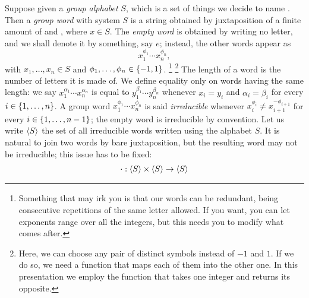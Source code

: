 \begin{example}\label{example:FreeGroup}
Suppose given a {\em group alphabet} \(S\), which is a set of things we decide to name . Then a {\em group word} with system \(S\) is a string obtained by juxtaposition of a finite amount of  and , where \(x \in S\). The {\em empty word} is obtained by writing no letter, and we shall denote it by something, say \(e\); instead, the other words appear as
\[x_1^{\phi_1} \cdots{} x_n^{\phi_n},\]
with \(x_1, \dots{}, x_n \in S\) and \(\phi_1, \dots{}, \phi_n \in \left\{-1, 1\right\}\).
\footnote{Something that may irk you is that our words can be redundant, being consecutive repetitions of the same letter allowed. If you want, you can let exponents range over all the integers, but this needs you to modify what comes after.}
\footnote{Here, we can choose any pair of distinct symbols instead of \(-1\) and \(1\). If we do so, we need a function that maps each of them into the other one. In this presentation we employ the function that takes one integer and returns its opposite.}
\newline
The length of a word is the number of letters it is made of. We define equality only on words having the same length: we say \(x_1^{\alpha_1} \cdots{} x_n^{\alpha_n}\) is equal to \(y_1^{\beta_1} \cdots{} y_n^{\beta_n}\) whenever \(x_i = y_i\) and \(\alpha_i = \beta_i\) for every \(i \in \left\{1, \dots{}, n\right\}\).\newline
A group word \(x_1^{\phi_1} \cdots{} x_n^{\phi_n}\) is said {\em irreducible} whenever \(x_i^{\phi_i} \ne x_{i+1}^{-\phi_{i+1}}\) for every \(i \in \left\{1, \dots{}, n-1\right\}\); the empty word is irreducible by convention. Let us write \(\left\langle S\right\rangle\) the set of all irreducible words written using the alphabet \(S\). It is natural to join two words by bare juxtaposition, but the resulting word may not be irreducible; this issue has to be fixed:
\[\begin{aligned}
& \cdot : \angled S \times \angled S \to \angled S \\

\end{aligned}\]
\end{example}
